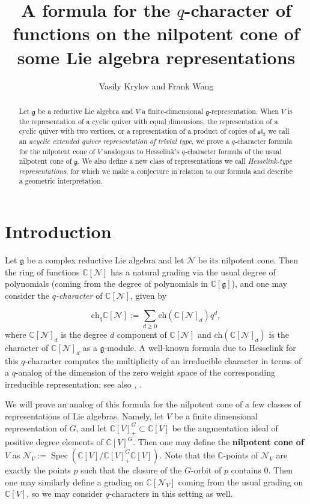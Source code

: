 \documentclass[12pt]{article}
\title{A formula for the $q$-character of functions on the nilpotent cone of some Lie algebra representations}
\author{Vasily Krylov and Frank Wang}
\newcommand{\C}{\mathbb{C}}
\renewcommand{\sl}{\mathfrak{sl}}
\DeclareMathOperator{\Spec}{Spec}
\theoremstyle{definition}
\theoremstyle{remark}
\newcommand{\g}{\mathfrak{g}}
\newcommand{\ch}{\mathrm{ch}}
\newcommand{\N}{\mathcal{N}}
\begin{document}
\maketitle

\begin{abstract}
    Let $\g$ be a reductive Lie algebra and $V$ a finite-dimensional $\g$-representation. When $V$ is the representation of a cyclic quiver with equal dimensions, the representation of a cyclic quiver with two vertices, or a representation of a product of copies of $\sl_2$ we call an \emph{acyclic extended quiver representation of trivial type}, we prove a $q$-character formula for the nilpotent cone of $V$ analogous to Hesselink's $q$-character formula of the usual nilpotent cone of $\g$. We also define a new class of representations we call \emph{Hesselink-type representations}, for which we make a conjecture in relation to our formula and describe a geometric interpretation.
\end{abstract}

\section{Introduction}

Let $\g$ be a complex reductive Lie algebra and let $\N$ be its nilpotent cone. Then the ring of functions $\C[\N]$ has a natural grading via the usual degree of polynomials (coming from the degree of polynomials in $\C[\g]$), and one may consider the \emph{$q$-character} of $\C[\N]$, given by

\[\ch_q\C[\N]:=\sum_{d\geq 0}\ch(\C[\N]_d)q^d,\]
where $\C[\N]_d$ is the degree $d$ component of $\C[\N]$ and $\ch(\C[\N]_d)$ is the character of $\C[\N]_d$ as a $\g$-module. A well-known formula due to Hesselink \cite{hesselinkalg} for this $q$-character computes the multiplicity of an irreducible character in terms of a $q$-analog of the dimension of the zero weight space of the corresponding irreducible representation; see also \cite{mcgovern1989}, \cite[Proposition 4.0.1]{MasonBrown2022RegularFO}.

We will prove an analog of this formula for the nilpotent cone of a few classes of representations of Lie algebras. Namely, let $V$ be a finite dimensional representation of $G$, and let $\C[V]^G_+\subset\C[V]$ be the augmentation ideal of positive degree elements of $\C[V]^G$. Then one may define the \textbf{nilpotent cone of $V$} as $\N_V:=\Spec (\C[V]/\C[V]^G_+\C[V])$. Note that the $\C$-points of $\N_V$ are exactly the points $p$ such that the closure of the $G$-orbit of $p$ contains $0$. Then one may similarly define a grading on $\C[\N_V]$ coming from the usual grading on $\C[V]$, so we may consider $q$-characters in this setting as well. 
\end{document}
